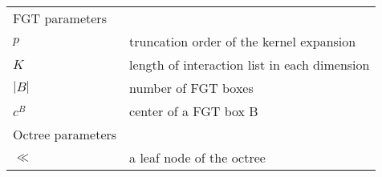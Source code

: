  
\begin{table}[ht!]
\small
\begin{tabular}{|ll|}
\hline 
FGT parameters &\\
$p$                         & truncation order of the kernel expansion \\
$K$                         & length of interaction list in each dimension \\
$|B|$                       & number of FGT boxes \\
$c^B$                       & center of a FGT box B \\
\hline 
Octree parameters &\\
$\ll$                       & a leaf node of the octree \\
\hline
\end{tabular}
\label{t:notation}
\end{table}

